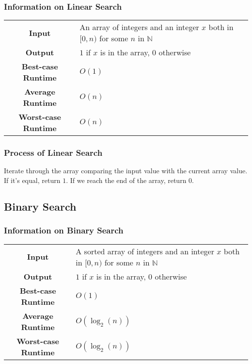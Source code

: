 \documentclass[a4paper, 12pt, twoside]{article}
\begin{document}
\subsubsection{Information on Linear Search}

\begin{center}
      \begin{tabular}{ || c | p{8.5cm} || }
            \hline
                  \textbf{Input} & An array of integers and an integer
                        $x$ both in $[0, n)$ for some $n$ in $\mathbb{N}$ \\
                  \textbf{Output} & $1$ if $x$ is in the array, $0$
                        otherwise \\
            \hline\hline
                  \textbf{Best-case Runtime} & $O(1)$ \\
                  \textbf{Average Runtime} & $O(n)$ \\
                  \textbf{Worst-case Runtime} & $O(n)$ \\
            \hline
      \end{tabular}
\end{center}

\subsubsection{Process of Linear Search}

Iterate through the array comparing the input value with the current
array value. If it's equal, return $1$. If we reach the end of the
array, return $0$.

\subsection{Binary Search}

\subsubsection{Information on Binary Search}

\begin{center}
      \begin{tabular}{ || c | p{8.5cm} || }
            \hline
                  \textbf{Input} & A sorted array of integers and 
                        an integer $x$ both in $[0, n)$ for some $n$
                        in $\mathbb{N}$ \\
                  \textbf{Output} & $1$ if $x$ is in the array, $0$
                        otherwise \\
            \hline\hline
                  \textbf{Best-case Runtime} & $O(1)$ \\
                  \textbf{Average Runtime} & $O(\log_2(n))$ \\
                  \textbf{Worst-case Runtime} & $O(\log_2(n))$ \\
            \hline
      \end{tabular}
\end{center}
\end{document}

